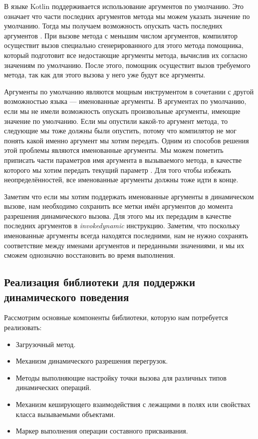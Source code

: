 В языке Kotlin поддерживается использование аргументов по умолчанию. Это означает что части последних аргументов метода мы можем указать значение по умолчанию. Тогда мы получаем возможность опускать часть последних аргументов \cite{book:jemerov2017kotlininAction}. При вызове метода с меньшим числом аргументов, компилятор осуществит вызов специально сгенерированного для этого метода помощника, который подготовит все недостающие аргументы метода, вычислив их согласно значениям по умолчанию. После этого, помощник осуществит вызов требуемого метода, так как для этого вызова у него уже будут все аргументы.

Аргументы по умолчанию являются мощным инструментом в сочетании с другой возможностью языка --- именованные аргументы. В аргументах по умолчанию, если мы не имели возможность опускать произвольные аргументы, имеющие значение по умолчанию. Если мы опустили какой-то аргумент метода, то следующие мы тоже должны были опустить, потому что компилятор не мог понять какой именно аргумент мы хотим передать. Одним из способов решения этой проблемы являются именованные аргументы. Мы можем пометить приписать части параметров имя аргумента в вызываемого метода, в качестве которого мы хотим передать текущий параметр \cite{book:jemerov2017kotlininAction}. Для того чтобы избежать неопределённостей, все именованные аргументы должны тоже идти в конце.

Заметим что если мы хотим поддержать именованные аргументы в динамическом вызове, нам необходимо сохранить все метки имён аргументов до момента разрешения динамического вызова. Для этого мы их передадим в качестве последних аргументов в \textit{invokedynamic} инструкцию. Заметим, что поскольку именованные аргументы всегда находятся последними, нам не нужно сохранять соответствие между именами аргументов и переданными значениями, и мы их сможем однозначно восстановить во время выполнения.


\subsection{Реализация библиотеки для поддержки динамического поведения}
\label{sec:dynamicLibrary}

Рассмотрим основные компоненты библиотеки, которую нам потребуется реализовать:

\begin{itemize}
    \item Загрузочный метод.
    \item Механизм динамического разрешения перегрузок.
    \item Методы выполняющие настройку точки вызова для различных типов динамических операций.
    \item Механизм кеширующего взаимодействия с лежащими в полях или свойствах класса вызываемыми объектами.
    \item Маркер выполнения операции составного присваивания.
\end{itemize}

